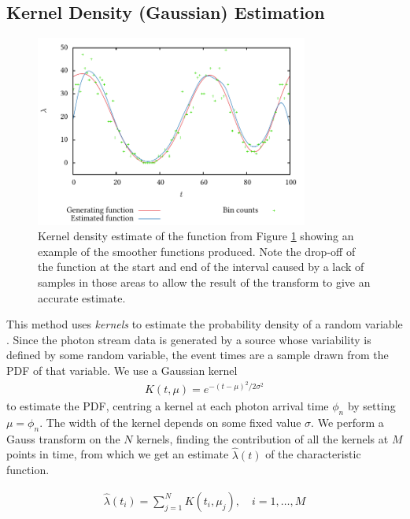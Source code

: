 \documentclass[a4paper,11pt]{article}
\begin{document}
\subsection{Kernel Density (Gaussian) Estimation}
\label{sec-3-2}

    \begin{figure}[h]
    \centering
    \includegraphics[width=0.8\textwidth]{images/kde}

    \caption{Kernel density estimate of the function from Figure
    \ref{fig:basecomp} showing an example of the smoother functions
    produced. Note the drop-off of the function at the start and end of the
    interval caused by a lack of samples in those areas to allow the result of
    the transform to give an accurate estimate.}

    \label{fig:basecomp}
    \end{figure}

   This method uses \emph{kernels} to estimate the probability density of a
   random variable \cite{cuevas}. Since the photon stream data is generated
   by a source whose variability is defined by some random variable, the event
   times are a sample drawn from the PDF of that variable. We use a Gaussian
   kernel
   \begin{align}
   K(t,\mu)=e^{-(t-\mu)^2/2\sigma^2}
   \end{align}
   to estimate the PDF, centring a kernel at each photon arrival time $\phi_n$ by
   setting $\mu=\phi_n$. The width of the kernel depends on some fixed value
   $\sigma$. We perform a Gauss transform on the $N$ kernels, finding the
   contribution of all the kernels at $M$ points in time, from which we get an
   estimate $\hat{\lambda}(t)$ of the characteristic function.

   \begin{align}
   \hat{\lambda}(t_i) = \sum_{j=1}^N K(t_i,\mu_j), \quad i=1,\dots,M
   \end{align}
\end{document}
